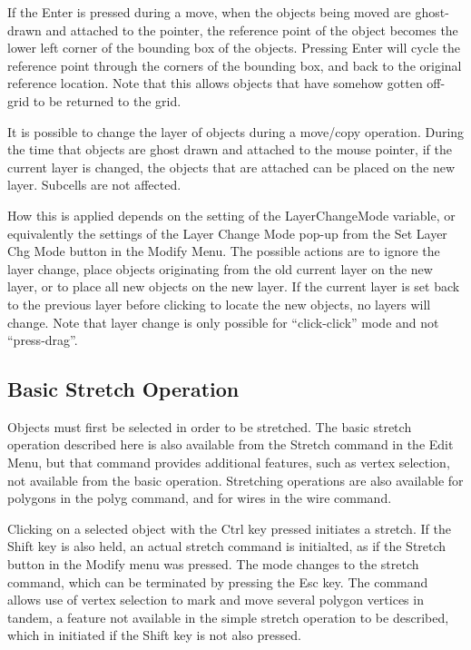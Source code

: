 If the {\kb Enter} is pressed during a move, when the objects being
moved are ghost-drawn and attached to the pointer, the reference point
of the object becomes the lower left corner of the bounding box of the
objects.  Pressing {\kb Enter} will cycle the reference point through
the corners of the bounding box, and back to the original reference
location.  Note that this allows objects that have somehow gotten
off-grid to be returned to the grid.

It is possible to change the layer of objects during a move/copy
operation.  During the time that objects are ghost drawn and attached
to the mouse pointer, if the current layer is changed, the objects
that are attached can be placed on the new layer.  Subcells are not
affected.

How this is applied depends on the setting of the {\et
LayerChangeMode} variable, or equivalently the settings of the {\cb
Layer Change Mode} pop-up from the {\cb Set Layer Chg Mode} button
in the {\cb Modify Menu}.  The possible actions are to ignore the
layer change, place objects originating from the old current layer on
the new layer, or to place all new objects on the new layer.  If the
current layer is set back to the previous layer before clicking to
locate the new objects, no layers will change.  Note that layer change
is only possible for ``click-click'' mode and not ``press-drag''.

\subsection{Basic Stretch Operation}

Objects must first be selected in order to be stretched.  The basic
stretch operation described here is also available from the {\cb
Stretch} command in the {\cb Edit Menu}, but that command provides
additional features, such as vertex selection, not available from the
basic operation.  Stretching operations are also available for
polygons in the {\cb polyg} command, and for wires in the {\cb wire}
command.

Clicking on a selected object with the {\kb Ctrl} key pressed
initiates a stretch.  If the {\kb Shift} key is also held, an actual
stretch command is initialted, as if the {\cb Stretch} button in the
{\cb Modify} menu was pressed.  The mode changes to the stretch
command, which can be terminated by pressing the {\kb Esc} key.  The
command allows use of vertex selection to mark and move several
polygon vertices in tandem, a feature not available in the simple
stretch operation to be described, which in initiated if the {\kb
Shift} key is not also pressed.

